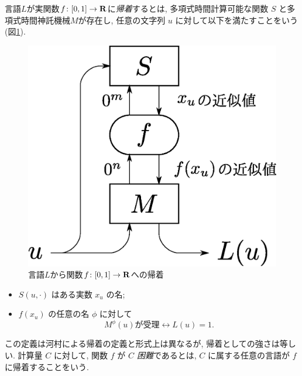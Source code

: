\begin{definition}[帰着]
  言語$L$が実関数$f \colon [0, 1] \to \mathbf R$に\emph{帰着}するとは, 
  多項式時間計算可能な関数 $S$ と多項式時間神託機械$M$が存在し, 
  任意の文字列 $u$ に対して以下を満たすことをいう(図\ref{fig:reduction}). 
 \begin{figure}
  \begin{center}
  \includegraphics[scale=0.25]{image/reduction.eps}
  \caption{言語$L$から関数$f \colon [0,1] \to \mathbf R$への帰着}
  \label{fig:reduction}
  \end{center}
 \end{figure}
  \begin{itemize}
   \item $S(u, \cdot)$ はある実数 $x_u$ の名;
   \item $f(x_u)$ の任意の名 $\phi$ に対して
	 \[
	  M^\phi(u) \text{が受理} \leftrightarrow L(u) = 1.
	 \]
  \end{itemize}
\end{definition}
 この定義は河村による帰着の定義と形式上は異なるが,
 帰着としての強さは等しい.
 計算量 $C$ に対して, 関数 $f$ が \emph{$C$ 困難}であるとは,
 $C$ に属する任意の言語が $f$ に帰着することをいう.
